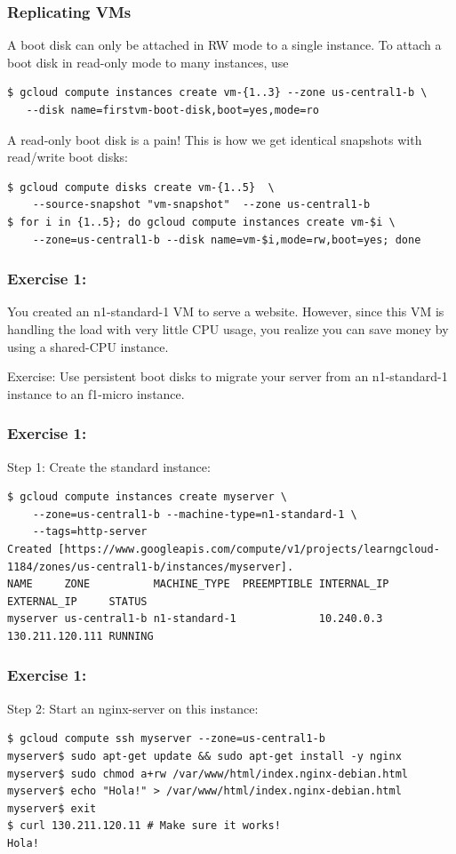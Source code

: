 \documentclass[9pt]{beamer}
\begin{document}
\begin{frame}[fragile]
  \frametitle{Replicating VMs}
  A boot disk can only be attached in RW mode to a single instance. To attach a boot disk in read-only mode to many instances, use
  \begin{verbatim}
$ gcloud compute instances create vm-{1..3} --zone us-central1-b \
   --disk name=firstvm-boot-disk,boot=yes,mode=ro
  \end{verbatim}
A read-only boot disk is a pain! This is how we get identical snapshots with read/write boot disks:
\begin{verbatim}
$ gcloud compute disks create vm-{1..5}  \
    --source-snapshot "vm-snapshot"  --zone us-central1-b
$ for i in {1..5}; do gcloud compute instances create vm-$i \
    --zone=us-central1-b --disk name=vm-$i,mode=rw,boot=yes; done
\end{verbatim}
\end{frame}

\begin{frame}[fragile]
\frametitle{Exercise 1:}
You created an n1-standard-1 VM to serve a website. However, since this VM is handling the load with very little CPU usage, you realize you can save money by using a shared-CPU instance.

Exercise: Use persistent boot disks to migrate your server from an n1-standard-1 instance to an f1-micro instance.
\end{frame}

\begin{frame}[fragile]
\frametitle{Exercise 1:}
Step 1: Create the standard instance:
\begin{verbatim}
$ gcloud compute instances create myserver \
    --zone=us-central1-b --machine-type=n1-standard-1 \
    --tags=http-server
Created [https://www.googleapis.com/compute/v1/projects/learngcloud-1184/zones/us-central1-b/instances/myserver].
NAME     ZONE          MACHINE_TYPE  PREEMPTIBLE INTERNAL_IP EXTERNAL_IP     STATUS
myserver us-central1-b n1-standard-1             10.240.0.3  130.211.120.111 RUNNING
\end{verbatim}
\end{frame}

\begin{frame}[fragile]
\frametitle{Exercise 1:}
Step 2: Start an nginx-server on this instance:
\begin{verbatim}
$ gcloud compute ssh myserver --zone=us-central1-b
myserver$ sudo apt-get update && sudo apt-get install -y nginx
myserver$ sudo chmod a+rw /var/www/html/index.nginx-debian.html
myserver$ echo "Hola!" > /var/www/html/index.nginx-debian.html
myserver$ exit
$ curl 130.211.120.11 # Make sure it works!
Hola!
\end{verbatim}
\end{frame}
\end{document}
